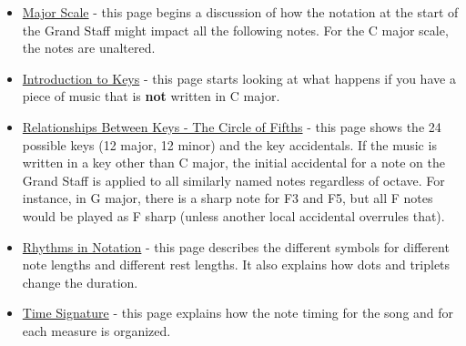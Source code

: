 \documentclass[12pt]{article}
\begin{document}
\begin{itemize}
    \item \href{https://www.musiccrashcourses.com/lessons/scales_major.html}{Major Scale} - this page begins a discussion of how the notation at the start of the Grand Staff might impact all the following notes.  For the C major scale, the notes are unaltered.
    \item \href{https://www.musiccrashcourses.com/lessons/keys.html}{Introduction to Keys} - this page starts looking at what happens if you have a piece of music that is \textbf{not} written in C major.
    \item \href{https://www.musiccrashcourses.com/lessons/key_relationships.html}{Relationships Between Keys - The Circle of Fifths} - this page shows the 24 possible keys (12 major, 12 minor) and the key accidentals.  If the music is written in a key other than C major, the initial accidental for a note on the Grand Staff is applied to all similarly named notes regardless of octave.  For instance, in G major, there is a sharp note for F3 and F5, but all F notes would be played as F sharp (unless another local accidental overrules that).
    \item \href{https://www.musiccrashcourses.com/lessons/rhythm_notation.html}{Rhythms in Notation} - this page describes the different symbols for different note lengths and different rest lengths.  It also explains how dots and triplets change the duration.  
    \item \href{https://www.musiccrashcourses.com/lessons/time_signatures.html}{Time Signature} - this page explains how the note timing for the song and for each measure is organized.
\end{itemize}
\end{document}
